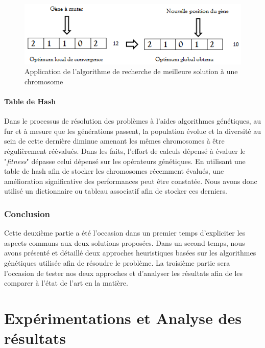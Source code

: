 \documentclass[12pt,a4paper]{article}
\begin{document}
	\begin{figure}[!h]
		\begin{center}
			\includegraphics[scale=.6]{img/local_search_fig.png}
			\caption{Application de l'algorithme de recherche de meilleure solution à une chromosome}
			\label{fig:local_search_fig}
		\end{center}
	\end{figure} 
	
	\subsection{Table de Hash}
	Dans le processus de résolution des problèmes à l'aides algorithmes génétiques, au fur et à mesure que les générations passent, la population évolue et la diversité au sein de cette dernière diminue amenant les mêmes chromosomes à être régulièrement réévalués. Dans les faits, l'effort de calculs dépensé à évaluer le "\emph{fitness}" dépasse celui dépensé sur les opérateurs génétiques. En utilisant une table de hash afin de stocker les chromosomes récemment évalués, une amélioration significative des performances peut être constatée. Nous avons donc utilisé un dictionnaire ou tableau associatif afin de stocker ces derniers.
	
	\section*{Conclusion}
	Cette deuxième partie a été l'occasion dans un premier temps d'expliciter les aspects communs aux deux solutions proposées. Dans un second temps, nous avons présenté et détaillé deux approches heuristiques basées sur les algorithmes génétiques utilisée afin de résoudre le problème. La troisième partie sera l'occasion de tester nos deux approches et d'analyser les résultats afin de les comparer à l'état de l'art en la matière.
	
	\newpage
	
	\part{Expérimentations et Analyse des résultats}
	\setcounter{section}{0}
\end{document}
